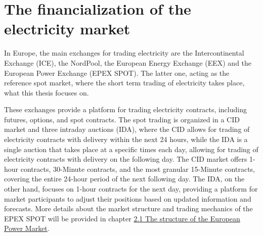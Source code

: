 \documentclass[12pt,a4paper]{cau_thesis}
\begin{document}
\section{The financialization of the electricity market}\label{sec:financialization}
In Europe, the main exchanges for trading electricity are the
Intercontinental Exchange (ICE), the NordPool, the European Energy
Exchange (EEX) and the European Power Exchange (EPEX SPOT). The
latter one, acting as the reference spot market, where the short term
trading of electricity takes place, what this thesis focuses on.

These exchanges provide a platform for trading electricity contracts,
including futures, options, and spot contracts. The spot trading is
organized in a CID market and three intraday auctions (IDA), where
the CID allows for trading of electricity contracts with delivery
within the next 24 hours, while the IDA is a single auction that
takes place at a specific times each day, allowing for trading of
electricity contracts with delivery on the following day. The CID
market offers 1-hour contracts, 30-Minute contracts, and the most
granular 15-Minute contracts, covering the entire 24-hour period of
the next following day. The IDA, on the other hand, focuses on 1-hour
contracts for the next day, providing a platform for market
participants to adjust their positions based on updated information
and forecasts. More details about the market structure and trading
mechanics of the EPEX SPOT will be provided in chapter
\hyperref[sec:structure_european_power_market]{2.1 The structure of
    the European Power Market}.
\end{document}
